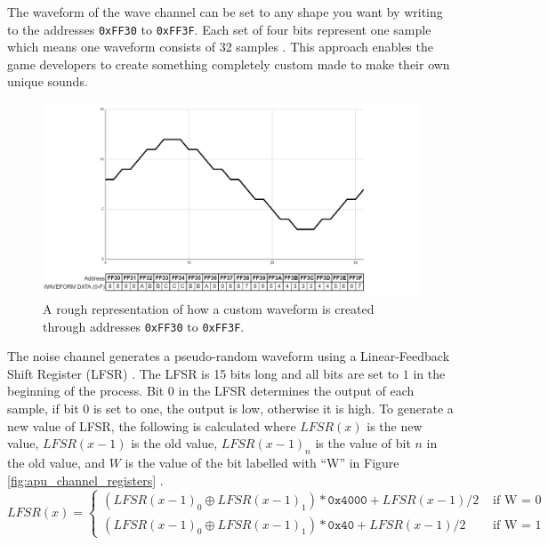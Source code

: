 The waveform of the wave channel can be set to any shape you want by writing to the addresses \texttt{0xFF30} to \texttt{0xFF3F}. Each set of four bits represent one sample which means one waveform consists of 32 samples \cite{AudioHardware}. This approach enables the game developers to create something completely custom made to make their own unique sounds.
\begin{figure}[H]
    \centering
    \includegraphics[width=1\textwidth]{figures/APU/apu_custom_waveform.png}
    \caption{A rough representation of how a custom waveform is created through addresses \texttt{0xFF30} to \texttt{0xFF3F}.}
    \label{fig:custom_wave_form}
\end{figure}

The noise channel generates a pseudo-random waveform using a Linear-Feedback Shift Register (LFSR) \cite{apuNoise}. The LFSR is 15 bits long and all bits are set to $1$ in the beginning of the process. Bit 0 in the LFSR determines the output of each sample, if bit 0 is set to one, the output is low, otherwise it is high. To generate a new value of LFSR, the following is calculated where $LFSR(x)$ is the new value, $LFSR(x-1)$ is the old value, $LFSR(x-1)_n$ is the value of bit $n$ in the old value, and $W$ is the value of the bit labelled with ``W'' in Figure \ref{fig:apu_channel_registers} \cite{AudioHardware}.
\begin{equation*}
    LFSR(x) =
    \begin{cases}
        (LFSR(x-1)_0 \oplus LFSR(x-1)_1)*\texttt{0x4000} + LFSR(x-1)/2 & \text{ if W = 0} \\
       (LFSR(x-1)_0 \oplus LFSR(x-1)_1)*\texttt{0x40} + LFSR(x-1)/2 & \text{ if W = 1}
    \end{cases}
\end{equation*}
